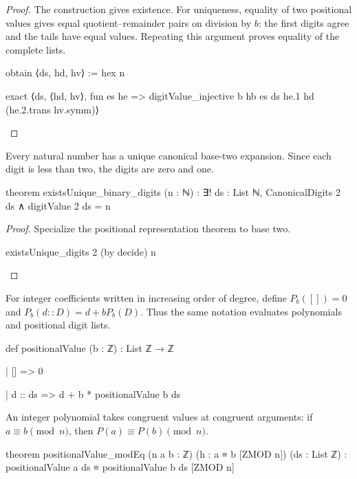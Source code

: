 \begin{proof}
  The construction gives existence.
  For uniqueness, equality of two positional values gives equal quotient--remainder pairs on
  division by $b$: the first digits agree and the tails have equal values.
  Repeating this argument proves equality of the complete lists.

  \begin{lean}
    obtain ⟨ds, hd, hv⟩ := hex n

    exact ⟨ds, ⟨hd, hv⟩, fun es he => digitValue_injective b hb es ds he.1 hd (he.2.trans hv.symm)⟩
  \end{lean}
\end{proof}

\begin{theorem}
  \label{ent:thm:existsunique-binary-digits}
  Every natural number has a unique canonical base-two expansion.
  Since each digit is less than two, the digits are zero and one.

  \begin{lean}
    theorem existsUnique_binary_digits (n : ℕ) :
        ∃! ds : List ℕ, CanonicalDigits 2 ds ∧ digitValue 2 ds = n
  \end{lean}
\end{theorem}

\begin{proof}
  Specialize the positional representation theorem to base two.

  \begin{lean}
    existsUnique_digits 2 (by decide) n
  \end{lean}
\end{proof}

\begin{definition}
  For integer coefficients written in increasing order of degree, define $P_b([])=0$ and
  $P_b(d::D)=d+bP_b(D)$.
  Thus the same notation evaluates polynomials and positional digit lists.

  \begin{lean}
    def positionalValue (b : ℤ) : List ℤ → ℤ

      | [] => 0

      | d :: ds => d + b * positionalValue b ds
  \end{lean}
\end{definition}

\begin{theorem}
  \label{ent:thm:positionalvalue-modeq}
  An integer polynomial takes congruent values at congruent arguments: if $a\equiv b\pmod n$, then
  $P(a)\equiv P(b)\pmod n$.

  \begin{lean}
    theorem positionalValue_modEq (n a b : ℤ) (h : a ≡ b [ZMOD n]) (ds : List ℤ) :
        positionalValue a ds ≡ positionalValue b ds [ZMOD n]
  \end{lean}
\end{theorem}

